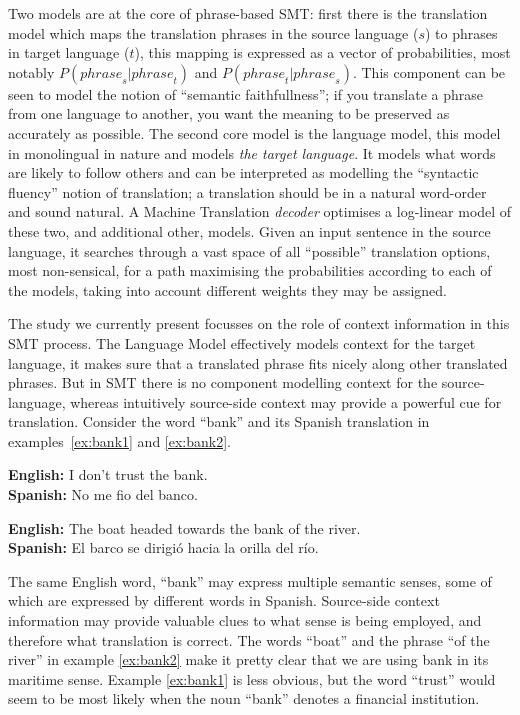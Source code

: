 \documentclass[11pt]{article}
\begin{document}
Two models are at the core of phrase-based SMT: first there is the translation
model which maps the translation phrases in the source language ($s$) to
phrases in target language ($t$), this mapping is expressed as a vector of
probabilities, most notably $P({phrase}_s|{phrase}_t)$ and
$P({phrase}_t|{phrase}_s)$. This component can be seen to model the notion of
``semantic faithfullness''; if you translate a phrase from one language to
another, you want the meaning to be preserved as accurately as possible. The
second core model is the language model, this model in monolingual in nature
and models \emph{the target language}. It models what words are likely to
follow others and can be interpreted as modelling the ``syntactic fluency''
notion of translation; a translation should be in a natural word-order and
sound natural. A Machine Translation \emph{decoder} optimises a log-linear
model of these two, and additional other, models. Given an input sentence in
the source language, it searches through a vast space of all ``possible''
translation options, most non-sensical, for a path maximising the probabilities
according to each of the models, taking into account different weights they may
be assigned.

The study we currently present focusses on the role of context information in
this SMT process. The Language Model effectively models context for the target
language, it makes sure that a translated phrase fits nicely along other
translated phrases. But in SMT there is no component modelling context for the
source-language, whereas intuitively source-side context may provide a powerful
cue for translation. Consider the word ``bank'' and its Spanish translation in
examples~\ref{ex:bank1} and \ref{ex:bank2}.

\begin{exe} %
\ex \textbf{English:} I don't trust the bank. \\
    \textbf{Spanish:} No me fio del banco.
\label{ex:bank1}

\ex \textbf{English:} The boat headed towards the bank of the river. \\
    \textbf{Spanish:} El barco se dirigió hacia la orilla del río.
\label{ex:bank2}
\end{exe}

The same English word, ``bank'' may express multiple semantic senses, some of
which are expressed by different words in Spanish. Source-side context
information may provide valuable clues to what sense is being employed, and
therefore what translation is correct.  The words ``boat'' and the phrase ``of
the river'' in example \ref{ex:bank2} make it pretty clear that we are using
bank in its maritime sense. Example \ref{ex:bank1} is less obvious, but the
word ``trust'' would seem to be most likely when the noun ``bank'' denotes a
financial institution.
\end{document}
